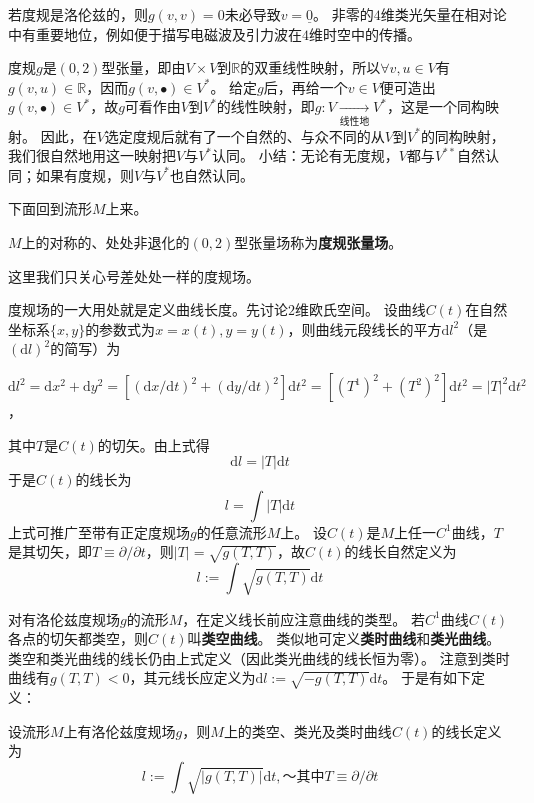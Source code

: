 \begin{note}
若度规是洛伦兹的，则$g(v, v) = 0$未必导致$v = \underline{0}$。
非零的$4$维类光矢量在相对论中有重要地位，例如便于描写电磁波及引力波在$4$维时空中的传播。
\end{note}

度规$g$是$(0, 2)$型张量，即由$V \times V$到$\mathbb{R}$的双重线性映射，所以$\forall v, u \in V$有$g(v, u) \in \mathbb{R}$，因而$g(v, \bullet) \in V^*$。
给定$g$后，再给一个$v \in V$便可造出$g(v, \bullet) \in V^*$，故$g$可看作由$V$到$V^*$的线性映射，即$g \colon V \xrightarrow[\text{线性地}]{} V^*$，这是一个同构映射。
因此，在$V$选定度规后就有了一个自然的、与众不同的从$V$到$V^*$的同构映射，我们很自然地用这一映射把$V$与$V^*$认同。
小结：无论有无度规，$V$都与$V^{**}$自然认同；如果有度规，则$V$与$V^*$也自然认同。

下面回到流形$M$上来。

\begin{definition}
$M$上的对称的、处处非退化的$(0, 2)$型张量场称为\textbf{度规张量场}。
\end{definition}

\begin{note}
这里我们只关心号差处处一样的度规场。
\end{note}

度规场的一大用处就是定义曲线长度。先讨论$2$维欧氏空间。
设曲线$C(t)$在自然坐标系$\{x, y\}$的参数式为$x = x(t), y = y(t)$，则曲线元段线长的平方$\mathrm{d}l^2$（是$(\mathrm{d}l)^2$的简写）为

$\mathrm{d}l^2 = \mathrm{d}x^2 + \mathrm{d}y^2 = [(\mathrm{d}x / \mathrm{d}t)^2 + (\mathrm{d}y / \mathrm{d}t)^2]\mathrm{d}t^2 = [(T^1)^2 + (T^2)^2]\mathrm{d}t^2 = |T|^2\mathrm{d}t^2$，

其中$T$是$C(t)$的切矢。由上式得
$$\mathrm{d}l = |T|\mathrm{d}t$$
于是$C(t)$的线长为
$$l = \int |T| \mathrm{d}t$$
上式可推广至带有正定度规场$g$的任意流形$M$上。
设$C(t)$是$M$上任一$C^1$曲线，$T$是其切矢，即$T \equiv \partial / \partial t$，则$|T| = \sqrt{g(T, T)}$，故$C(t)$的线长自然定义为
$$l := \int \sqrt{g(T, T)}\mathrm{d}t$$

对有洛伦兹度规场$g$的流形$M$，在定义线长前应注意曲线的类型。
若$C^1$曲线$C(t)$各点的切矢都类空，则$C(t)$叫\textbf{类空曲线}。
类似地可定义\textbf{类时曲线}和\textbf{类光曲线}。
类空和类光曲线的线长仍由上式定义（因此类光曲线的线长恒为零）。
注意到类时曲线有$g(T, T) < 0$，其元线长应定义为$\mathrm{d}l := \sqrt{-g(T, T)}\mathrm{d}t$。
于是有如下定义：

\begin{definition}
设流形$M$上有洛伦兹度规场$g$，则$M$上的类空、类光及类时曲线$C(t)$的线长定义为
$$l := \int\sqrt{|g(T, T)|}\mathrm{d}t, ～ \text{其中}T \equiv \partial / \partial t$$
\end{definition}


